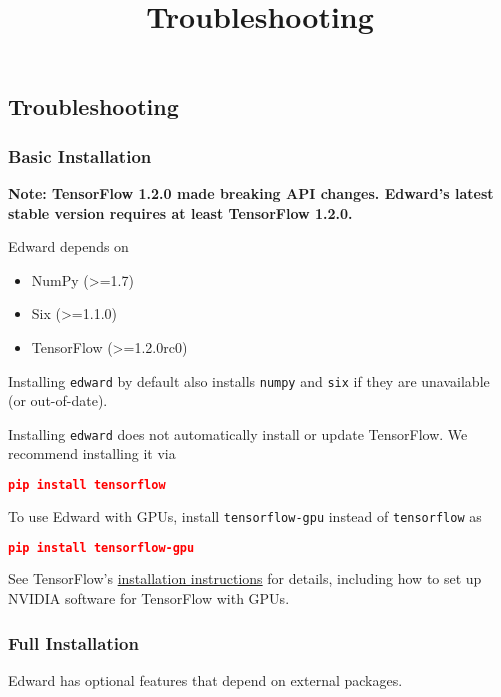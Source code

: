 \title{Troubleshooting}

\subsection{Troubleshooting}

\subsubsection{Basic Installation}

\textbf{Note:
TensorFlow 1.2.0 made breaking API changes.
Edward's latest stable version requires at least TensorFlow 1.2.0.
}

Edward depends on

\begin{itemize}
  \item NumPy (>=1.7)
  \item Six (>=1.1.0)
  \item TensorFlow (>=1.2.0rc0)
\end{itemize}

Installing \texttt{edward} by default also installs \texttt{numpy} and
\texttt{six} if they are unavailable (or out-of-date).

Installing \texttt{edward} does not automatically install or update
TensorFlow. We recommend installing it via

\begin{lstlisting}[language=JSON]
pip install tensorflow
\end{lstlisting}

To use Edward with GPUs, install \texttt{tensorflow-gpu} instead of
\texttt{tensorflow} as

\begin{lstlisting}[language=JSON]
pip install tensorflow-gpu
\end{lstlisting}

See TensorFlow's
\href{https://www.tensorflow.org/install/}{installation instructions}
for details, including how to set up NVIDIA software for TensorFlow with GPUs.

\subsubsection{Full Installation}

Edward has optional features that depend on external packages.

